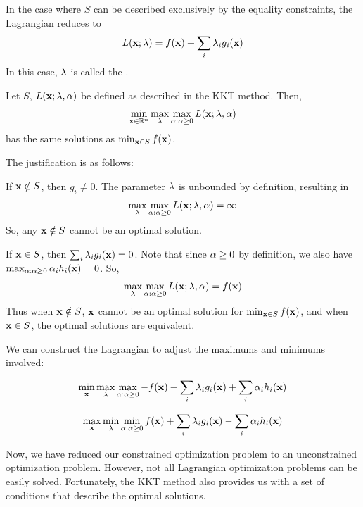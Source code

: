 \begin{remark}
In the case where $S$ can be described exclusively by the equality constraints, the Lagrangian reduces to $$L(\vx;\vlambda) = f(\vx) + \sum_{i} \lambda_{i} g_{i}(\vx)$$ In this case, $\vlambda$ is called the . 
\end{remark}

\begin{proposition}
Let $S$, $L(\vx;\vlambda,\valpha)$ be defined as described in the KKT method. Then, 
$$\min_{\vx \in \mathbb{R}^n} \max_{\vlambda} \max_{\valpha : \valpha \geq 0} L(\vx;\vlambda,\valpha)$$
has the same solutions as $\min_{\vx\in S} f(\vx)$.
\end{proposition}

The justification is as follows:

If $\vx \notin S$, then $g_{i}\neq 0$. The parameter $\vlambda$ is unbounded by definition, resulting in 
$$\max_{\vlambda} \max_{\valpha : \valpha \geq 0} L(\vx;\vlambda,\valpha)=\infty$$
So, any $\vx \notin S$ cannot be an optimal solution.

If $\vx \in S$, then $\sum_{i}\lambda_{i} g_{i}(\vx) = 0$. Note that since $\valpha\geq0$ by definition, we also have $\max_{\valpha : \valpha \geq 0} \valpha_{i} h_{i}(\vx) = 0$. So,   
$$\max_{\vlambda} \max_{\valpha : \valpha \geq 0} L(\vx;\vlambda,\valpha) = f(\vx)$$ 
Thus when $\vx \notin S$, $\vx$ cannot be an optimal solution for $\min_{\vx\in S} f(\vx)$, and when $\vx \in S$, the optimal solutions are equivalent. 

\begin{remark}
We can construct the Lagrangian to adjust the maximums and minimums involved:

$$\min_{\vx} \max_{\vlambda} \max_{\valpha : \valpha \geq 0} -f(\vx) + \sum_{i} \vlambda_{i} g_{i}(\vx) + \sum_{i} \valpha_{i} h_{i}(\vx)$$

$$\max_{\vx} \min_{\vlambda} \min_{\valpha : \valpha \geq 0} f(\vx) + \sum_{i} \vlambda_{i} g_{i}(\vx) - \sum_{i} \valpha_{i} h_{i}(\vx)$$
\end{remark}

Now, we have reduced our constrained optimization problem to an unconstrained optimization problem. However, not all Lagrangian optimization problems can be easily solved. Fortunately, the KKT method also provides us with a set of conditions that describe the optimal solutions. 

